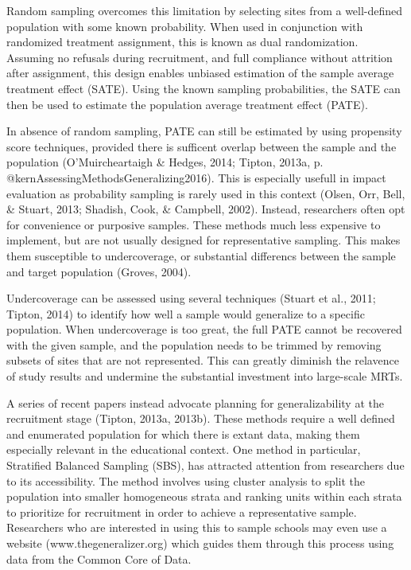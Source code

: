 \documentclass[man,floatsintext]{apa6}
\begin{document}
Random sampling overcomes this limitation by selecting sites from a well-defined population with some known probability. When used in conjunction with randomized treatment assignment, this is known as dual randomization. Assuming no refusals during recruitment, and full compliance without attrition after assignment, this design enables unbiased estimation of the sample average treatment effect (SATE). Using the known sampling probabilities, the SATE can then be used to estimate the population average treatment effect (PATE).

In absence of random sampling, PATE can still be estimated by using propensity score techniques, provided there is sufficent overlap between the sample and the population (O'Muircheartaigh \& Hedges, 2014; Tipton, 2013a, p. @kernAssessingMethodsGeneralizing2016). This is especially usefull in impact evaluation as probability sampling is rarely used in this context (Olsen, Orr, Bell, \& Stuart, 2013; Shadish, Cook, \& Campbell, 2002). Instead, researchers often opt for convenience or purposive samples. These methods much less expensive to implement, but are not usually designed for representative sampling. This makes them susceptible to undercoverage, or substantial differencs between the sample and target population (Groves, 2004).

Undercoverage can be assessed using several techniques (Stuart et al., 2011; Tipton, 2014) to identify how well a sample would generalize to a specific population. When undercoverage is too great, the full PATE cannot be recovered with the given sample, and the population needs to be trimmed by removing subsets of sites that are not represented. This can greatly diminish the relavence of study results and undermine the substantial investment into large-scale MRTs.

A series of recent papers instead advocate planning for generalizability at the recruitment stage (Tipton, 2013a, 2013b). These methods require a well defined and enumerated population for which there is extant data, making them especially relevant in the educational context. One method in particular, Stratified Balanced Sampling (SBS), has attracted attention from researchers due to its accessibility. The method involves using cluster analysis to split the population into smaller homogeneous strata and ranking units within each strata to prioritize for recruitment in order to achieve a representative sample. Researchers who are interested in using this to sample schools may even use a website (www.thegeneralizer.org) which guides them through this process using data from the Common Core of Data.
\end{document}
